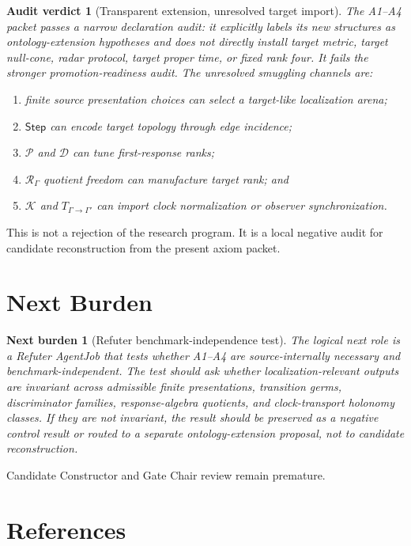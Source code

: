 \documentclass[11pt]{article}
\newcommand{\Step}{\mathsf{Step}}
\newcommand{\RespAlg}{\mathcal{R}_{\Gamma}}
\newtheorem{auditverdict}{Audit verdict}
\newtheorem{nextburden}{Next burden}
\begin{document}
\begin{auditverdict}[Transparent extension, unresolved target import]
The A1--A4 packet passes a narrow declaration audit: it explicitly labels its
new structures as ontology-extension hypotheses and does not directly install
target metric, target null-cone, radar protocol, target proper time, or fixed
rank four. It fails the stronger promotion-readiness audit. The unresolved
smuggling channels are:
\begin{enumerate}
    \item finite source presentation choices can select a target-like
    localization arena;
    \item \(\Step\) can encode target topology through edge incidence;
    \item \(\mathcal{P}\) and \(\mathcal{D}\) can tune first-response ranks;
    \item \(\RespAlg\) quotient freedom can manufacture target rank; and
    \item \(\mathcal{K}\) and \(T_{\Gamma\to\Gamma'}\) can import clock
    normalization or observer synchronization.
\end{enumerate}
\end{auditverdict}

This is not a rejection of the research program. It is a local negative audit
for candidate reconstruction from the present axiom packet.

\section{Next Burden}

\begin{nextburden}[Refuter benchmark-independence test]
The logical next role is a Refuter AgentJob that tests whether A1--A4 are
source-internally necessary and benchmark-independent. The test should ask
whether localization-relevant outputs are invariant across admissible finite
presentations, transition germs, discriminator families, response-algebra
quotients, and clock-transport holonomy classes. If they are not invariant,
the result should be preserved as a negative control result or routed to a
separate ontology-extension proposal, not to candidate reconstruction.
\end{nextburden}

Candidate Constructor and Gate Chair review remain premature.

\section*{References}
\end{document}

